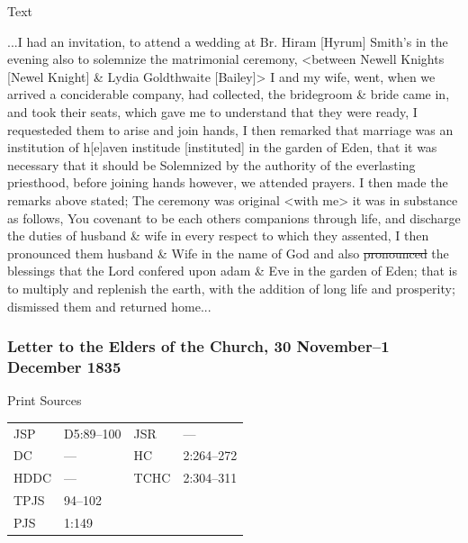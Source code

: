 			\begin{description}
				\item[Text]
			\end{description}
			
				...I had an invitation, to attend a wedding at Br. Hiram [Hyrum] Smith's in the evening also to solemnize the matrimonial ceremony, <between Newell Knights [Newel Knight] \& Lydia Goldthwaite [Bailey]> I and my wife, went, when we arrived a conciderable company, had collected, the bridegroom \& bride came in, and took their seats, which gave me to understand that they were ready, I requesteded them to arise and join hands, I then remarked that marriage was an institution of h[e]aven institude [instituted] in the garden of Eden, that it was necessary that it should be Solemnized by the authority of the everlasting priesthood, before joining hands however, we attended prayers. I then made the remarks above stated; The ceremony was original <with me> it was in substance as follows, You covenant to be each others companions through life, and discharge the duties of husband \& wife in every respect to which they assented, I then pronounced them husband \& Wife in the name of God and also \sout{pronounced} the blessings that the Lord confered upon adam \& Eve in the garden of Eden; that is to multiply and replenish the earth, with the addition of long life and prosperity; dismissed them and returned home...
				
		\subsubsection{Letter to the Elders of the Church, 30 November--1 December 1835}
			\label{EMS-1835-JS-30-NOV-1-DEC-1835}
			
			\begin{description}
				\item[Print Sources]
			\end{description}

				\begin{tabular}{p{0.5in}p{1in}p{0.5in}p{1in}}
				JSP	 	& D5:89--100		& JSR 		& --- \\
				DC	 	& --- 				& HC 		& 2:264--272 \\
				HDDC 	& ---				& TCHC 		& 2:304--311 \\
				TPJS 	& 94--102			& 	 		&  \\
				PJS 	& 1:149			& 	 		&  \\
				\end{tabular}
			
